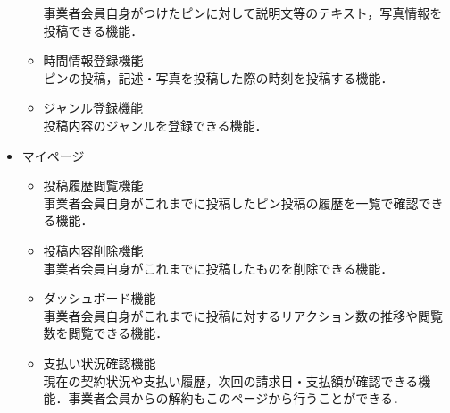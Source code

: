 \begin{itemize}[itemsep=10pt]
\begin{itemize}[itemsep=10pt]
        事業者会員自身がつけたピンに対して説明文等のテキスト，写真情報を投稿できる機能．
        \item 時間情報登録機能 \mbox{}\\
        ピンの投稿，記述・写真を投稿した際の時刻を投稿する機能．
        \item ジャンル登録機能 \mbox{}\\
        投稿内容のジャンルを登録できる機能．
    \end{itemize}
    \item マイページ
    \begin{itemize}[itemsep=10pt]
        \item 投稿履歴閲覧機能 \mbox{}\\
        事業者会員自身がこれまでに投稿したピン投稿の履歴を一覧で確認できる機能．
        \item 投稿内容削除機能 \mbox{}\\
        事業者会員自身がこれまでに投稿したものを削除できる機能．
        \item ダッシュボード機能 \mbox{} \\
        事業者会員自身がこれまでに投稿に対するリアクション数の推移や閲覧数を閲覧できる機能．
        \item 支払い状況確認機能 \mbox{} \\
        現在の契約状況や支払い履歴，次回の請求日・支払額が確認できる機能．事業者会員からの解約もこのページから行うことができる．
    \end{itemize}
\end{itemize}

